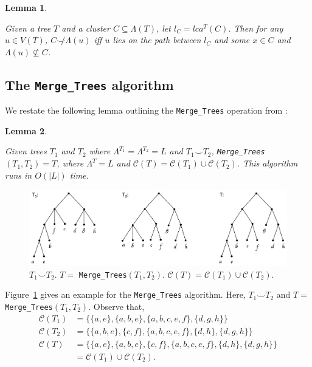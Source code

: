 \documentclass{article}
\newcommand{\compatible}{\smile}
\newcommand{\leafset}{\Lambda}
\newtheorem{incompatibility}{Lemma}
\newtheorem{mergetrees}[incompatibility]{Lemma}
\begin{document}
    \begin{incompatibility}
        \label{lem:incompatibility}

        Given a tree $T$ and a cluster $C \subseteq \leafset(T)$, let $l_C = lca^T(C)$. Then for any $u \in V(T)$, $C \not\compatible \leafset(u)$ iff $u$ lies on the path between $l_C$ and some $x \in C$ and $\leafset(u) \not\subseteq C$.
    \end{incompatibility}

    \subsection{The \texttt{Merge\_Trees} algorithm}
    \label{subsec:mergetrees}

    We restate the following lemma outlining the \texttt{Merge\_Trees} operation from \cite{jansson2016improved}:
    \newline

    \begin{mergetrees}
        \label{lem:mergetrees}

        Given trees $T_1$ and $T_2$ where $\leafset^{T_1} = \leafset^{T_2} = L$ and $T_1 \compatible T_2$, \texttt{Merge\_Trees}$(T_1, T_2) = T$, where $\leafset^T = L$ and $\mathcal{C}(T) = \mathcal{C}(T_1) \cup \mathcal{C}(T_2)$. This algorithm runs in $O(|L|)$ time.
    \end{mergetrees}

    \begin{figure}[h]
        \includegraphics[scale=0.5]{mergetrees}
        \centering
        \caption{$T_1 \compatible T_2$. $T =$ \texttt{Merge\_Trees}$(T_1, T_2)$. $\mathcal{C}(T) = \mathcal{C}(T_1) \cup \mathcal{C}(T_2)$.}
        \label{fig:mergetrees}
    \end{figure}

    Figure~\ref{fig:mergetrees} gives an example for the \texttt{Merge\_Trees} algorithm. Here, $T_1 \compatible T_2$ and $T =$ \texttt{Merge\_Trees}$(T_1, T_2)$. Observe that,
    \begin{align*}
        \mathcal{C}(T_1) &= \{\{a, e\}, \{a, b, e\}, \{a, b, c, e, f\}, \{d, g, h\}\}\\
        \mathcal{C}(T_2) &= \{\{a, b, e\}, \{c, f\}, \{a, b, c, e, f\}, \{d, h\}, \{d, g, h\}\}\\
        \mathcal{C}(T) &= \{\{a, e\}, \{a, b, e\}, \{c, f\}, \{a, b, c, e, f\}, \{d, h\}, \{d, g, h\}\}\\
        &= \mathcal{C}(T_1) \cup \mathcal{C}(T_2).
    \end{align*}
\end{document}
